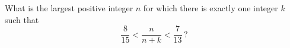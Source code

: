 What is the largest positive integer $n$ for which there is exactly one integer $k$ such that
\[\dfrac{8}{15}<\dfrac{n}{n+k}<\dfrac{7}{13}\,?\]
